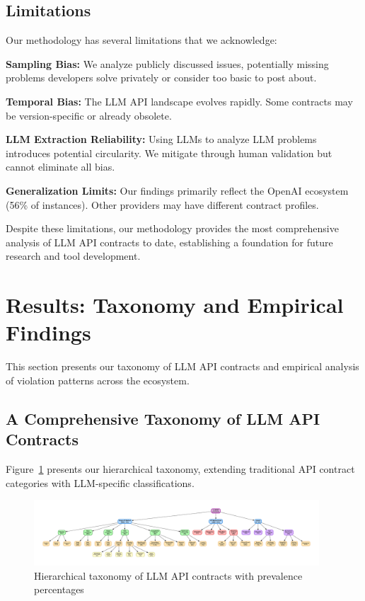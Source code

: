 \documentclass[11pt]{article}
\begin{document}
\subsection{Limitations}

Our methodology has several limitations that we acknowledge:

\textbf{Sampling Bias:} We analyze publicly discussed issues, potentially missing problems developers solve privately or consider too basic to post about.

\textbf{Temporal Bias:} The LLM API landscape evolves rapidly. Some contracts may be version-specific or already obsolete.

\textbf{LLM Extraction Reliability:} Using LLMs to analyze LLM problems introduces potential circularity. We mitigate through human validation but cannot eliminate all bias.

\textbf{Generalization Limits:} Our findings primarily reflect the OpenAI ecosystem (56\% of instances). Other providers may have different contract profiles.

Despite these limitations, our methodology provides the most comprehensive analysis of LLM API contracts to date, establishing a foundation for future research and tool development.

\section{Results: Taxonomy and Empirical Findings}
\label{sec:taxonomy}

This section presents our taxonomy of LLM API contracts and empirical analysis of violation patterns across the ecosystem.

\subsection{A Comprehensive Taxonomy of LLM API Contracts}

Figure~\ref{fig:taxonomy} presents our hierarchical taxonomy, extending traditional API contract categories with LLM-specific classifications.

\begin{figure}[h]
\centering
\includegraphics[width=0.95\textwidth]{fig2_taxonomy_tree.pdf}
\caption{Hierarchical taxonomy of LLM API contracts with prevalence percentages}
\label{fig:taxonomy}
\end{figure}
\end{document}
